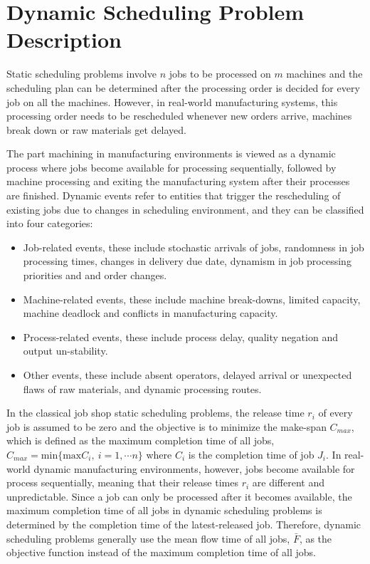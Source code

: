 \section{Dynamic Scheduling Problem Description}
Static scheduling problems involve $n$ jobs to be processed on $m$ machines and the scheduling plan can be determined after the processing order is decided for every job on all the machines.
However, in real-world manufacturing systems, this processing order needs to be rescheduled whenever new orders arrive, machines break down or raw materials get delayed.

The part machining in manufacturing environments is viewed as a dynamic process where jobs become available for processing sequentially, followed by machine processing and exiting the manufacturing system after their processes are finished.
Dynamic events refer to entities that trigger the rescheduling of existing jobs due to changes in scheduling environment, and they can be classified into four categories:
\begin{itemize}
	\item Job-related events, these include stochastic arrivals of jobs, randomness in job processing times, changes in delivery due date, dynamism in job processing priorities and and order changes.
	\item Machine-related events, these include machine break-downs, limited capacity, machine deadlock and conflicts in manufacturing capacity.
	\item Process-related events, these include process delay, quality negation and output un-stability.
	\item Other events, these include absent operators, delayed arrival or unexpected flaws of raw materials, and dynamic processing routes.
\end{itemize}

In the classical job shop static scheduling problems, the release time $r_i$ of every job is assumed to be zero and the objective is to minimize the make-span $C_{max}$, which is defined as the maximum completion time of all jobs, $C_{max} = \text{min}\{\text{max} C_i,\  i = 1, \cdots n\}$ where $C_i$ is the completion time of job $J_i$.
In real-world dynamic manufacturing environments, however, jobs become available for process sequentially, meaning that their release times $r_i$ are different and unpredictable. 
Since a job can only be processed after it becomes available, the maximum completion time of all jobs in dynamic scheduling problems is determined by the completion time of the latest-released job.
Therefore, dynamic scheduling problems generally use the mean flow time of all jobs, $\bar{F}$, as the objective function instead of the maximum completion time of all jobs.

